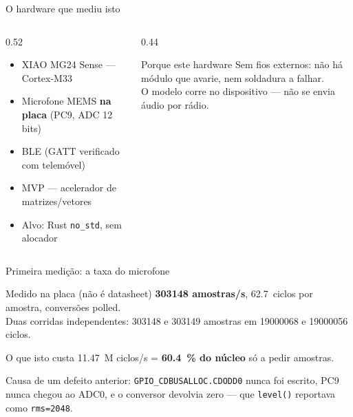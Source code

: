 \documentclass[aspectratio=169,10pt]{beamer}
\begin{document}
\begin{frame}{O hardware que mediu isto}
  \begin{columns}[T]
    \begin{column}{0.52\textwidth}
      \begin{itemize}
        \item XIAO MG24 Sense — Cortex-M33
        \item Microfone MEMS \textbf{na placa} (PC9, ADC 12 bits)
        \item BLE (GATT verificado com telemóvel)
        \item MVP — acelerador de matrizes/vetores
        \item Alvo: Rust \texttt{no\_std}, sem alocador
      \end{itemize}
    \end{column}
    \begin{column}{0.44\textwidth}
      \begin{block}{Porque este hardware}
        Sem fios externos: não há módulo que avarie, nem soldadura a falhar.\\
        O modelo corre no dispositivo — não se envia áudio por rádio.
      \end{block}
    \end{column}
  \end{columns}
\end{frame}

\begin{frame}{Primeira medição: a taxa do microfone}
  \begin{block}{Medido na placa (não é datasheet)}
    \textbf{\num{303148} amostras/s}, \SI{62.7}{ciclos} por amostra, conversões polled.\\
    Duas corridas independentes: \num{303148} e \num{303149} amostras em \num{19000068} e
    \num{19000056} ciclos.
  \end{block}
  \vspace{0.2cm}
  \begin{alertblock}{O que isto custa}
    \SI{11.47}{M} ciclos/s = \textbf{\SI{60.4}{\percent} do núcleo} só a pedir amostras.
  \end{alertblock}
  \vspace{0.2cm}
  \footnotesize Causa de um defeito anterior: \texttt{GPIO\_CDBUSALLOC.CDODD0} nunca foi escrito,
  PC9 nunca chegou ao ADC0, e o conversor devolvia zero — que \texttt{level()} reportava como
  \texttt{rms=2048}.
\end{frame}
\end{document}
